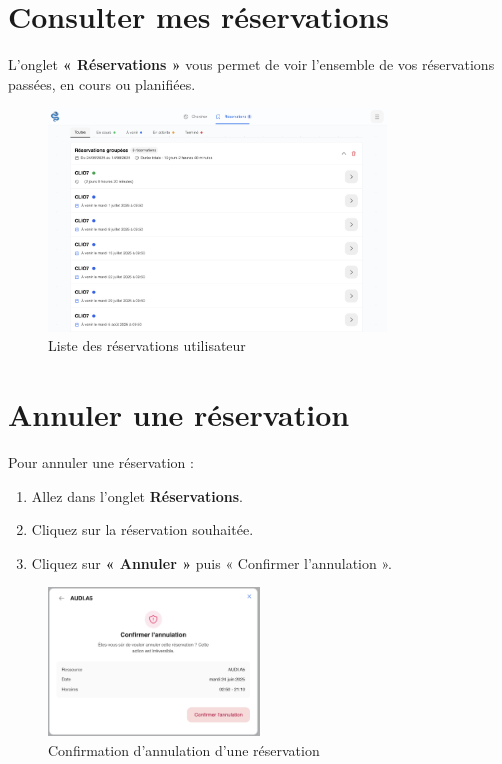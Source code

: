 \documentclass[a4paper,12pt]{article}
\begin{document}
\newpage

\section{Consulter mes réservations}

L’onglet \textbf{« Réservations »} vous permet de voir l’ensemble de vos réservations passées, en cours ou planifiées.

\begin{figure}[h!]
    \centering
    \includegraphics[width=0.8\textwidth]{UTILISATEUR/BOOKS_LISTINGS.png}
    \caption{Liste des réservations utilisateur}
    \label{fig:book-list}
\end{figure}

\newpage

\section{Annuler une réservation}

Pour annuler une réservation :

\begin{enumerate}
    \item Allez dans l’onglet \textbf{Réservations}.
    \item Cliquez sur la réservation souhaitée.
    \item Cliquez sur \textbf{« Annuler »} puis {« Confirmer l'annulation »}.
\end{enumerate}

\begin{figure}[h!]
    \centering
    \includegraphics[width=0.5\textwidth]{UTILISATEUR/CANCEL_BOOK_CONFIRM.png}
    \caption{Confirmation d’annulation d’une réservation}
\end{figure}
\end{document}
